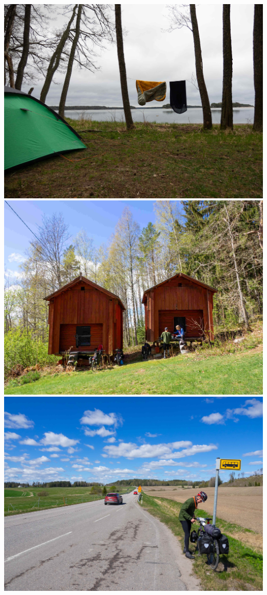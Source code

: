 \documentclass[10pt,finnish,a5paper,headings=small,twoside=semi]{scrartcl}
\begin{document}
\begin{multicols}{2}
	\columnbreak

	\begin{center}
		\noindent\includegraphics[width=0.94\linewidth]{assets/pyörävaellus6}
		\noindent\includegraphics[width=0.94\linewidth]{assets/pyörävaellus7}
		\noindent\includegraphics[width=0.94\linewidth]{assets/pyörävaellus8}

\end{center}
\end{multicols}
\end{document}
